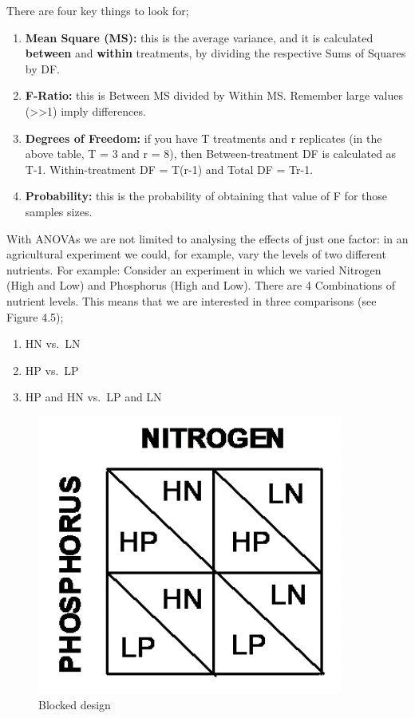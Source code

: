 \documentclass[
]{book}
\providecommand{\tightlist}{%
  \setlength{\itemsep}{0pt}\setlength{\parskip}{0pt}}
\begin{document}
There are four key things to look for;

\begin{enumerate}
\def\labelenumi{\arabic{enumi})}
\tightlist
\item
  \textbf{Mean Square (MS):} this is the average variance, and it is calculated \textbf{between} and \textbf{within} treatments, by dividing the respective Sums of Squares by DF.
\item
  \textbf{F-Ratio:} this is Between MS divided by Within MS. Remember large values (\textgreater\textgreater1) imply differences.
\item
  \textbf{Degrees of Freedom:} if you have T treatments and r replicates (in the above table, T = 3 and r = 8), then Between-treatment DF is calculated as T-1. Within-treatment DF = T(r-1) and Total DF = Tr-1.
\item
  \textbf{Probability:} this is the probability of obtaining that value of F for those samples sizes.
\end{enumerate}

With ANOVAs we are not limited to analysing the effects of just one factor: in an agricultural experiment we could, for example, vary the levels of two different nutrients. For example:
Consider an experiment in which we varied Nitrogen (High and Low) and Phosphorus (High and Low). There are 4 Combinations of nutrient levels. This means that we are interested in three comparisons (see Figure 4.5);

\begin{enumerate}
\def\labelenumi{\arabic{enumi})}
\tightlist
\item
  HN vs.~LN
\item
  HP vs.~LP
\item
  HP and HN vs.~LP and LN
\end{enumerate}

\begin{figure}
\includegraphics[width=0.4\linewidth]{figures/nitrogen_phosphorus} \caption{Blocked design}\label{fig:unnamed-chunk-47}
\end{figure}
\end{document}
